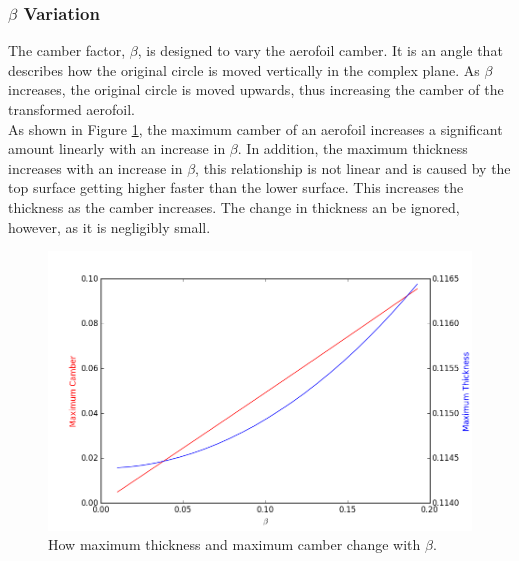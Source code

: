 \documentclass[10pt,a4paper]{article}
\begin{document}
\subsubsection{$\beta$ Variation}
The camber factor, $\beta$, is designed to vary the aerofoil camber. It is an angle that describes how the original circle is moved vertically in the complex plane. As $\beta$ increases, the original circle is moved upwards, thus increasing the camber of the transformed aerofoil.
\\As shown in Figure \ref{fig:beta_variation}, the maximum camber of an aerofoil increases a significant amount linearly with an increase in $\beta$. In addition, the maximum thickness increases with an increase in $\beta$, this relationship is not linear and is caused by the top surface getting higher faster than the lower surface. This increases the thickness as the camber increases. The change in thickness an be ignored, however, as it is negligibly small.
\begin{figure}[!htb]
\centering
\includegraphics[scale=0.4925]{Figures/beta_variation.png}
\caption{How maximum thickness and maximum camber change with $\beta$.}
\label{fig:beta_variation}
\end{figure}
\end{document}
